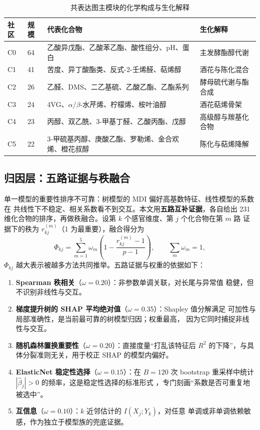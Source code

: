 \begin{table}[H]
\centering
\caption{共表达图主模块的化学构成与生化解释}
\label{tab:modules}
\small
\begin{fittable}
\begin{tabular}{@{}llp{}p{}@{}}
\toprule
社区 & 规模 & 代表化合物 & 生化解释 \\
\midrule
C0 & 64 & 乙酸异戊酯、乙酸苯乙酯、酸性组分、pH、蛋白 & 主发酵酯醇代谢 \\
C1 & 41 & 苦度、异丁酸酯类、反式-2-壬烯醛、萜烯醇 & 酒花与陈化混合 \\
C2 & 26 & 乙醛、DMS、二乙基硫、乙酸乙酯、乙酯系列 & 酵母硫代谢与酯合成 \\
C3 & 24 & 4VG、$\alpha$/$\beta$-水芹烯、柠檬烯、桉叶油醇 & 酒花萜烯骨架 \\
C4 & 23 & 丙醇、双乙酰、3-甲基丁醛、乙酸丙酯、戊醇 & 高级醇与羰基化合物 \\
C5 & 22 & 3-甲硫基丙醇、庚酸乙酯、罗勒烯、金合欢烯、橙花叔醇 & 陈化与萜烯降解 \\
\bottomrule
\end{tabular}
\end{fittable}
\end{table}

\subsection{归因层：五路证据与秩融合}

单一模型的重要性排序不可靠：树模型的 MDI 偏好高基数特征、线性模型的系数在
共线性下不稳定、相关系数看不到交互。本文用\textbf{五路互补证据}，各自给出
231 维化合物的排序，再做秩融合。设第 $k$ 个感官维度、第 $j$ 个化合物在第 $m$ 路
证据下的秩为 $r^{(m)}_{kj}$（1 为最重要），融合得分为
\begin{equation}
\Phi_{kj}=\sum_{m=1}^{5}\omega_m\left(1-\frac{r^{(m)}_{kj}-1}{p-1}\right),
\qquad \sum_m\omega_m=1 ,
\label{eq:rankfusion}
\end{equation}
$\Phi_{kj}$ 越大表示被越多方法共同推举。五路证据与权重的依据如下：

\begin{enumerate}[label=(\arabic*),leftmargin=2.2em,itemsep=1pt]
\item \textbf{Spearman 秩相关}（$\omega=0.20$）：非参数单调关联，对长尾与异常值
  稳健，但不识别非线性与交互。
\item \textbf{梯度提升树的 SHAP 平均绝对值}（$\omega=0.35$）：Shapley 值分解满足
  可加性与局部准确性，是当前最可靠的树模型归因\cite{lundberg2017}；权重最高，
  因为它同时捕捉非线性与交互。
\item \textbf{随机森林置换重要性}（$\omega=0.20$）：直接度量“打乱该特征后
  $R^2$ 的下降”，与具体分裂准则无关，用于校正 SHAP 的模型内偏好。
\item \textbf{ElasticNet 稳定性选择}（$\omega=0.15$）：在 $B=120$ 次 bootstrap
  重采样中统计 $|\hat\beta_j|>0$ 的频率，这是稳定性选择的标准形式
  \cite{meinshausen2010}，专门刻画“系数是否可重复地被选中”。
\item \textbf{互信息}（$\omega=0.10$）：$k$ 近邻估计的 $I(X_j;Y_k)$，对任意
  单调或非单调依赖敏感，作为独立于模型族的兜底证据。
\end{enumerate}

